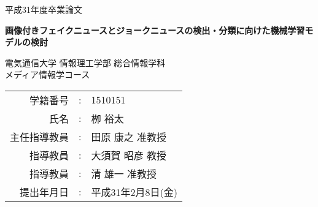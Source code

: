 \documentclass[a4paper,12pt,oneside,openany,uplatex]{jsbook}
\begin{document}
%
%
\frontmatter
\begin{titlepage}
  \vspace*{7mm}
  \begin{center}
    \Large{平成31年度卒業論文}\\

    \vspace{40truemm}

    \LARGE{\textbf{画像付きフェイクニュースとジョークニュースの検出・分類に向けた機械学習モデルの検討}}\\

    \vspace{30truemm}

    \Large{電気通信大学 情報理工学部 総合情報学科}\\
    \Large{メディア情報学コース}\\

    \vspace{15truemm}

    \begin{table*}[h]
        \centering
        \hspace*{4em}
        \begin{tabular}{rcl}
            \large{学籍番号}&\large{:}&\large{1510151} \\
            \large{氏名}&\large{:}&\large{栁 裕太} \vspace{5truemm} \\
            \large{主任指導教員}&\large{:}&\large{田原 康之 准教授} \vspace{5truemm} \\
            \large{指導教員}&\large{:}&\large{大須賀 昭彦 教授} \vspace{5truemm} \\
            \large{指導教員}&\large{:}&\large{清 雄一 准教授} \vspace{5truemm} \\
            \large{提出年月日}&\large{:}&\large{平成31年2月8日(金)} \\
        \end{tabular}
    \end{table*}
  \end{center}
\end{titlepage}
%


\tableofcontents
%
\mainmatter





\end{document}
